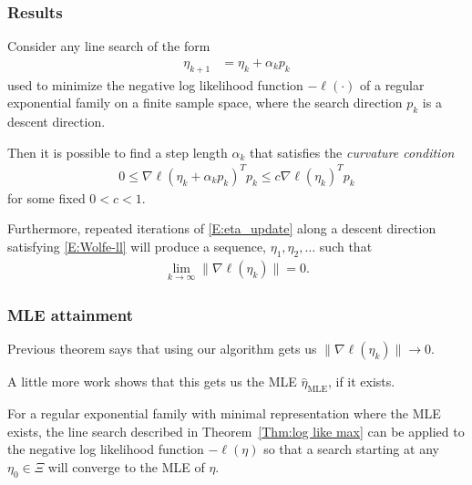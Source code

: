 \documentclass[ 10pt]{beamer}
\newcommand{\etaMLE}{\hat{\eta}_{\textrm{MLE}}}
\begin{document}
\frame
{
\frametitle{Results}
{\small
\begin{theorem} \label{Thm:log like max}
Consider any line search of the form 
\begin{align}
	\eta_{k+1} &= \eta_k + \alpha_k p_k \label{E:eta_update}
\end{align}
used to minimize the negative log likelihood function $-\ell(\cdot)$ of a regular 
exponential family on a finite sample space, where the search direction $p_k$ 
is a descent direction.

Then it is possible to find a step length $\alpha_k$ 
that satisfies the \emph{curvature condition}
\begin{align}
	0 \leq \nabla \ell( \eta_k + \alpha_k p_k)^T p_k  \leq c \nabla \ell(\eta_k)^T p_k  
\label{E:Wolfe-ll}
\end{align}
for some fixed $0 < c < 1$.

Furthermore, repeated iterations of \eqref{E:eta_update} along a descent direction 
satisfying \eqref{E:Wolfe-ll} will produce a sequence, $\eta_1, \eta_2, \ldots$ such 
that
\begin{align*}
	\lim_{k \to \infty} \lVert \nabla \ell(\eta_k) \rVert = 0.
\end{align*}
\end{theorem}
}
}

\frame
{
\frametitle{MLE attainment}
Previous theorem says that using our algorithm gets us 
$\lVert \nabla \ell(\eta_k) \rVert \to 0$.  

A little more work shows that this gets us the MLE $\etaMLE$, if it exists.

\begin{theorem} \label{Thm:Line Search works}
For a regular exponential family with minimal representation where the MLE exists, the 
line search described in 
Theorem~\ref{Thm:log like max} can be applied to the negative log likelihood function 
$-\ell(\eta)$ so that a search 
starting at any $\eta_0 \in \Xi$ will converge to the MLE of $\eta$.
\end{theorem}

}

\end{document}
